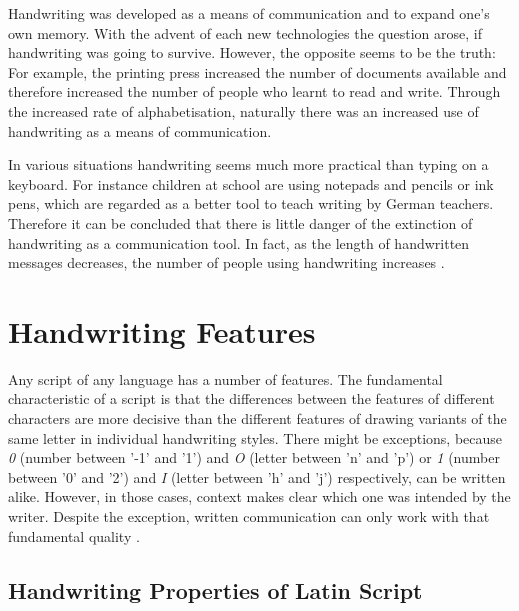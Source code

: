 Handwriting was developed as a means of communication and to expand one's own
memory. With the advent of each new technologies the question arose, 
if handwriting was going to survive. However, the opposite seems to be the 
truth: For example, the printing press increased the number of documents
available and therefore increased the number of people who learnt to read
and write. Through the increased rate of alphabetisation, naturally there was
an increased use of handwriting as a means of communication.

In various situations handwriting seems much more practical than typing on a
keyboard. For instance children at school are using notepads and pencils or
ink pens, which are regarded as a better tool to teach writing by German 
teachers. Therefore it can be concluded that there is little danger of
the extinction of handwriting as a communication tool. In fact, as 
the length of handwritten messages decreases, the number of people using 
handwriting increases .

\section{Handwriting Features}
\label{sec:handwritingfeatures}

Any script of any language has a number of features. The fundamental 
characteristic of a script is that the differences between the features
of different characters are more decisive than the different features of 
drawing variants of the same letter in individual handwriting styles.
There might be exceptions, because \emph{0} (number between '-1' and '1') and 
\emph{O} (letter between 'n' and 'p') or \emph{1} (number between '0' and '2') 
and \emph{I} (letter between 'h' and 'j') respectively, can be written alike. 
However, in those cases, context makes clear which one was intended by the 
writer. Despite the exception, written communication can only work with that
fundamental quality .

\subsection{Handwriting Properties of Latin Script}
\label{sec:handwritingpropertieslatin}

